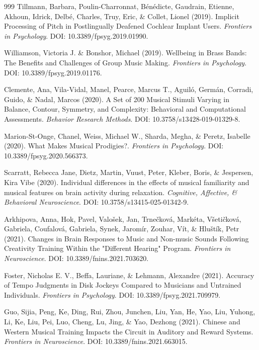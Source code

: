 \documentclass[9pt,onecolumn]{article}
\begin{document}
\begin{thebibliography}{999}
Tillmann, Barbara, Poulin-Charronnat, Bénédicte, Gaudrain, Etienne, Akhoun, Idrick, Delbé, Charles, Truy, Eric, \& Collet, Lionel (2019). Implicit Processing of Pitch in Postlingually Deafened Cochlear Implant Users. \textit{Frontiers in Psychology}. DOI: 10.3389/fpsyg.2019.01990.

Williamson, Victoria J. \& Bonshor, Michael (2019). Wellbeing in Brass Bands: The Benefits and Challenges of Group Music Making. \textit{Frontiers in Psychology}. DOI: 10.3389/fpsyg.2019.01176.

Clemente, Ana, Vila-Vidal, Manel, Pearce, Marcus T., Aguiló, Germán, Corradi, Guido, \& Nadal, Marcos (2020). A Set of 200 Musical Stimuli Varying in Balance, Contour, Symmetry, and Complexity: Behavioral and Computational Assessments. \textit{Behavior Research Methods}. DOI: 10.3758/s13428-019-01329-8.

Marion-St-Onge, Chanel, Weiss, Michael W., Sharda, Megha, \& Peretz, Isabelle (2020). What Makes Musical Prodigies?. \textit{Frontiers in Psychology}. DOI: 10.3389/fpsyg.2020.566373.

Scarratt, Rebecca Jane, Dietz, Martin, Vuust, Peter, Kleber, Boris, \& Jespersen, Kira Vibe (2020). Individual differences in the effects of musical familiarity and musical features on brain activity during relaxation. \textit{Cognitive, Affective, \& Behavioral Neuroscience}. DOI: 10.3758/s13415-025-01342-9.

Arkhipova, Anna, Hok, Pavel, Valošek, Jan, Trnečková, Markéta, Všetičková, Gabriela, Coufalová, Gabriela, Synek, Jaromír, Zouhar, Vít, \& Hluštík, Petr (2021). Changes in Brain Responses to Music and Non-music Sounds Following Creativity Training Within the "Different Hearing" Program. \textit{Frontiers in Neuroscience}. DOI: 10.3389/fnins.2021.703620.

Foster, Nicholas E. V., Beffa, Lauriane, \& Lehmann, Alexandre (2021). Accuracy of Tempo Judgments in Disk Jockeys Compared to Musicians and Untrained Individuals. \textit{Frontiers in Psychology}. DOI: 10.3389/fpsyg.2021.709979.

Guo, Sijia, Peng, Ke, Ding, Rui, Zhou, Junchen, Liu, Yan, He, Yao, Liu, Yuhong, Li, Ke, Liu, Pei, Luo, Cheng, Lu, Jing, \& Yao, Dezhong (2021). Chinese and Western Musical Training Impacts the Circuit in Auditory and Reward Systems. \textit{Frontiers in Neuroscience}. DOI: 10.3389/fnins.2021.663015.


\end{thebibliography}
\end{document}
